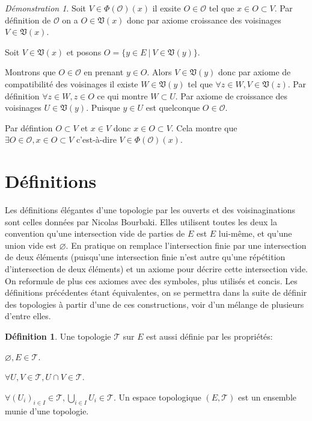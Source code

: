 \documentclass[a4paper, 11pt, french]{book}
\newenvironment{itemise}{\itemize}{\enditemize}
\theoremstyle{plain} %
\theoremstyle{definition} %
\newtheorem{definition}{Définition}
\theoremstyle{remark} %
\newtheorem*{demonstration}{Démonstration}
\newcommand{\1}{\mathds{1}}
\newcommand\vide{\varnothing}
\renewcommand{\frak}[1]{\mathfrak{#1}}
\newcommand{\scr}[1]{\mathscr{#1}}
\newcommand\ens[2]{\{#1 \ |\ #2\}}
\begin{document}
\begin{demonstration}
\begin{itemise}
\begin{itemise}
\begin{itemise}
				\item Soit $V\in\Phi(\scr{O})(x)$ il exsite $O\in\scr{O}$ tel que $x\in O\subset V$.
				Par définition de $\scr{O}$ on a $O\in\frak{V}(x)$ donc par axiome croissance des voisinages $V\in\frak{V}(x)$.
				\item Soit $V\in\frak{V}(x)$ et posons $O=\ens{y\in E}{V\in\frak{V}(y)}$.
				\begin{itemise}
					\item Montrons que $O\in\scr{O}$ en prenant $y\in O$.
					Alors $V\in\frak{V}(y)$ donc par axiome de compatibilité des voisinages il existe $W\in\frak{V}(y)$ tel que $\forall z\in W, V\in\frak{V}(z)$.
					Par définition $\forall z\in W, z\in O$ ce qui montre $W\subset U$.
					Par axiome de croissance des voisinages $U\in\frak{V}(y)$.
					Puisque $y\in U$ est quelconque $O\in\scr{O}$.
					\item Par défintion $O\subset V$ et $x\in V$ donc $x\in O\subset V$.
				\end{itemise}
				Cela montre que $\exists O\in\scr{O}, x\in O\subset V$ c'est-à-dire $V\in\Phi(\scr{O})(x)$.
			\end{itemise}
		\end{itemise}
	\end{itemise}
\end{demonstration}

\section{Définitions}

Les définitions élégantes d'une topologie par les ouverts et des voisinaginations sont celles données par Nicolas Bourbaki.
Elles utilisent toutes les deux la convention qu'une intersection vide de parties de $E$ est $E$ lui-même, et qu'une union vide est $\vide$.
En pratique on remplace l'intersection finie par une intersection de deux éléments (puisqu'une intersection finie n'est autre qu'une répétition d'intersection de deux éléments) et un axiome pour décrire cette intersection vide.
On reformule de plus ces axiomes avec des symboles, plus utilisés et concis.
Les définitions précédentes étant équivalentes, on se permettra dans la suite de définir des topologies à partir d'une de ces constructions, voir d'un mélange de plusieurs d'entre elles.

\begin{definition}
	Une topologie $\scr{T}$ sur $E$ est aussi définie par les propriétés:
	\begin{itemise}
		\item $\vide, E\in\scr{T}$.
		\item $\forall U, V\in\scr{T}, U\cap V\in\scr{T}$.
		\item $\forall (U_i)_{i\in I}\in\scr{T}, \bigcup_{i\in I}U_i\in\scr{T}$.
	\end{itemise}
	Un espace topologique $(E, \scr{T})$ est un ensemble munie d'une topologie.
\end{definition}
\end{document}
